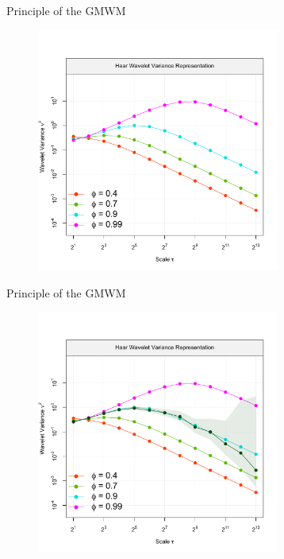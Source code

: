 \documentclass[envcountsect,usenames,dvipsnames]{beamer}
\theoremstyle{mystyle}
\begin{document}
\begin{frame}{Principle of the GMWM}

	\begin{figure}
	\vspace{-0.5cm}
	    \centering
	  \includegraphics[width = 8cm]{Images/AR1WVtheo.pdf}
	\end{figure}
\end{frame}


\begin{frame}{Principle of the GMWM}

	\begin{figure}
		\vspace{-0.5cm}

	    \centering
	  \includegraphics[width = 8cm]{Images/AR12WVempir.pdf}
	\end{figure}
\end{frame}
\end{document}
